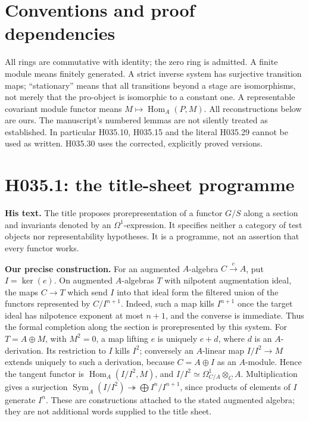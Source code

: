 
\section*{Conventions and proof dependencies}
All rings are commutative with identity; the zero ring is admitted. A finite
module means finitely generated. A strict inverse system has surjective
transition maps; ``stationary'' means that all transitions beyond a stage
are isomorphisms, not merely that the pro-object is isomorphic to a constant
one. A representable covariant module functor means
$M\mapsto\operatorname{Hom}_A(P,M)$. All reconstructions below are ours.
The manuscript's numbered lemmas are not silently treated as established.
In particular H035.10, H035.15 and the literal H035.29 cannot be used as
written. H035.30 uses the corrected, explicitly proved versions.

\section{H035.1: the title-sheet programme}
\textbf{His text.} The title proposes prorepresentation of a functor
$G/S$ along a section and invariants denoted by an $\Omega^1$-expression.
It specifies neither a category of test objects nor representability
hypotheses. It is a programme, not an assertion that every functor works.

\textbf{Our precise construction.} For an augmented $A$-algebra
$C\xrightarrow{e}A$, put $I=\ker(e)$. On augmented $A$-algebras $T$ with
nilpotent augmentation ideal, the maps $C\to T$ which send $I$ into that
ideal form the filtered union of the functors represented by
$C/I^{n+1}$. Indeed, such a map kills $I^{n+1}$ once the target ideal has
nilpotence exponent at most $n+1$, and the converse is immediate. Thus
the formal completion along the section is prorepresented by this system.
For $T=A\oplus M$, with $M^2=0$, a map lifting $e$ is uniquely $e+d$,
where $d$ is an $A$-derivation. Its restriction to $I$ kills $I^2$;
conversely an $A$-linear map $I/I^2\to M$ extends uniquely to such a
derivation, because $C=A\oplus I$ as an $A$-module. Hence the tangent
functor is $\operatorname{Hom}_A(I/I^2,M)$, and
$I/I^2\simeq\Omega^1_{C/A}\otimes_C A$. Multiplication gives a
surjection $\operatorname{Sym}_A(I/I^2)\twoheadrightarrow
\bigoplus I^n/I^{n+1}$, since products of elements of $I$ generate $I^n$.
These are constructions attached to the stated augmented algebra; they
are not additional words supplied to the title sheet.

